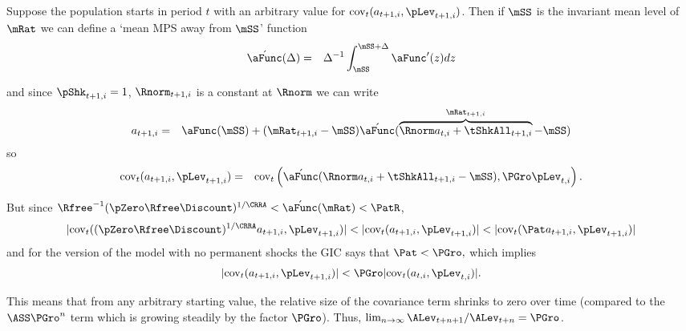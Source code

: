 \documentclass[titlepage]{\econtex}\providecommand{\texname}{BufferStockTheory}%
\begin{document}
Suppose the population starts in period $t$ with an arbitrary value for
 $\mbox{cov}_{t}(a_{t+1,i},\pLev_{t+1,i})$. 
  Then if $\mSS$ is the invariant mean
level of $\mRat$ we can define a `mean MPS away from $\mSS$' function
\begin{eqnarray}
 \acute{\aFunc}(\Delta) & = &  \Delta^{-1}\int_{\mSS}^{\mSS+\Delta} \aFunc^{\prime}(z)
 dz \label{eq:checkaFunc} \nonumber
\end{eqnarray}
\begin{comment}
so that
\begin{eqnarray}
 \aFunc(\mRat_{t+1,i}) & = & \aFunc(\Rnorm_{t+1,i} a_{t+1,i}+\tShkAll_{t+1,i})
\\ & = & \aFunc(\mSS) +(\mRat_{t+1,i}-\mSS)\acute{\aFunc}(\Rnorm  a_{t+1,i}+\tShkAll_{t+1,i})
\end{eqnarray}
\end{comment}
and since $\pShk_{t+1,i}=1$, $\Rnorm_{t+1,i}$ is a constant at $\Rnorm$ we can write
\begin{eqnarray}
  a_{t+1,i} & = &
  \aFunc(\mSS)+(\mRat_{t+1,i}-\mSS)\acute{\aFunc}(\overbrace{\Rnorm
    a_{t,i}+\tShkAll_{t+1,i}}^{\mRat_{t+1,i}}-\mSS) \nonumber
\end{eqnarray}
so
\begin{eqnarray}
\mbox{cov}_{t}(a_{t+1,i},\pLev_{t+1,i})
&=&\mbox{cov}_{t}\left(\acute{\aFunc}(\Rnorm  a_{t,i}+\tShkAll_{t+1,i}-\mSS)
  ,\PGro   \pLev_{t,i}\right). \nonumber
\end{eqnarray}

But since ${\Rfree}^{-1}(\pZero  \Rfree\Discount)^{1/\CRRA} < \acute{\aFunc}(\mRat) < \PatR $,
\begin{equation}
  |\mbox{cov}_{t}((\pZero  \Rfree\Discount)^{1/\CRRA}a_{t+1,i},\pLev_{t+1,i})| <
  |\mbox{cov}_{t}(a_{t+1,i},\pLev_{t+1,i})| <
  |\mbox{cov}_{t}({\Pat}a_{t+1,i},\pLev_{t+1,i})| \nonumber
\end{equation}
and for the version of the model with no permanent shocks the GIC
says that
${\Pat} < \PGro, $ which implies
\begin{eqnarray}
  |\mbox{cov}_{t}(a_{t+1,i},\pLev_{t+1,i})| < \PGro
  |\mbox{cov}_{t}(a_{t,i},\pLev_{t,i})|. \nonumber
\end{eqnarray}

This means that from any arbitrary starting value, the relative
size of the covariance term shrinks to zero over time (compared
to the $\ASS \PGro^{n}$ term which is growing steadily
by the factor $\PGro$).  Thus, $\lim_{n \rightarrow \infty} \ALev_{t+n+1}/\ALev_{t+n} = \PGro$.
\end{document}
